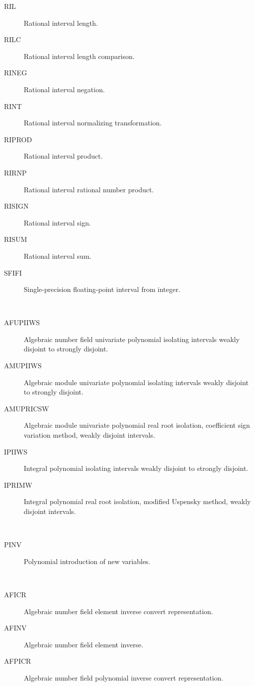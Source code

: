 \begin{description}
\begin{description}
  \item[RIL]  Rational interval length.
  \item[RILC]  Rational interval length comparison.
  \item[RINEG]  Rational interval negation.
  \item[RINT]  Rational interval normalizing transformation.
  \item[RIPROD]  Rational interval product.
  \item[RIRNP]  Rational interval rational number product.
  \item[RISIGN]  Rational interval sign.
  \item[RISUM]  Rational interval sum.
  \item[SFIFI]  Single-precision floating-point interval from integer.
  \end{description}
\item[intervals] \ \ 
  \begin{description}
  \item[AFUPIIWS]  Algebraic number field univariate polynomial isolating
    intervals weakly disjoint to strongly disjoint.
  \item[AMUPIIWS]  Algebraic module univariate polynomial isolating intervals
    weakly disjoint to strongly disjoint.
  \item[AMUPRICSW]  Algebraic module univariate polynomial real root
    isolation, coefficient sign variation method, weakly disjoint intervals.
  \item[IPIIWS]  Integral polynomial isolating intervals weakly disjoint to
    strongly disjoint.
  \item[IPRIMW]  Integral polynomial real root isolation, modified Uspensky
    method, weakly disjoint intervals.
  \end{description}
\item[introduction] \ \ 
  \begin{description}
  \item[PINV]  Polynomial introduction of new variables.
  \end{description}
\item[inverse] \ \ 
  \begin{description}
  \item[AFICR]  Algebraic number field element inverse convert representation.
  \item[AFINV]  Algebraic number field element inverse.
  \item[AFPICR]  Algebraic number field polynomial inverse convert
    representation.

\end{description}
\end{description}
